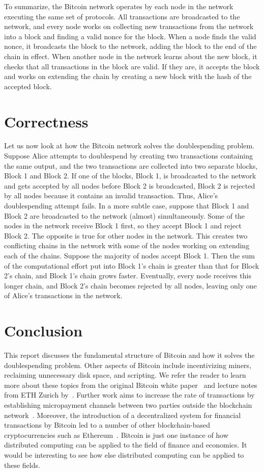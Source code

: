 \documentclass{article}
\begin{document}
To summarize, the Bitcoin network operates by each node in the network executing
the same set of protocols. All transactions are broadcasted to the network, and
every node works on collecting new transactions from the network into a block
and finding a valid nonce for the block. When a node finds the valid nonce, it
broadcasts the block to the network, adding the block to the end of the chain in
effect. When another node in the network learns about the new block, it checks
that all transactions in the block are valid. If they are, it accepts the block
and works on extending the chain by creating a new block with the hash of the
accepted block.

\section{Correctness}

Let us now look at how the Bitcoin network solves the doublespending problem.
Suppose Alice attempts to doublespend by creating two transactions containing
the same output, and the two transactions are collected into two separate
blocks, Block 1 and Block 2. If one of the blocks, Block 1, is broadcasted to
the network and gets accepted by all nodes before Block 2 is broadcasted, Block
2 is rejected by all nodes because it contains an invalid transaction. Thus,
Alice’s doublespending attempt fails. In a more subtle case, suppose that Block
1 and Block 2 are broadcasted to the network (almost) simultaneously. Some of
the nodes in the network receive Block 1 first, so they accept Block 1 and
reject Block 2. The opposite is true for other nodes in the network. This
creates two conflicting chains in the network with some of the nodes working on
extending each of the chains. Suppose the majority of nodes accept Block 1. Then
the sum of the computational effort put into Block 1’s chain is greater than
that for Block 2’s chain, and Block 1’s chain grows faster. Eventually, every
node receives this longer chain, and Block 2’s chain becomes rejected by all
nodes, leaving only one of Alice’s transactions in the network.

\section{Conclusion}

This report discusses the fundamental structure of Bitcoin and how it solves the
doublespending problem. Other aspects of Bitcoin include incentivizing miners,
reclaiming unnecessary disk space, and scripting. We refer the reader to learn
more about these topics from the original Bitcoin white paper~\citep{Nakamoto08}
and lecture notes from ETH Zurich by~\citeauthor{ETH15}. Further work aims to
increase the rate of transactions  by establishing micropayment channels between
two parties outside the blockchain network~\citep{Decker15}. Moreover, the
introduction of a decentralized system for financial transactions by Bitcoin led
to a number of other blockchain-based cryptocurrencies such as
Ethereum~\citep{Buterin14}. Bitcoin is just one instance of how distributed
computing can be applied to the field of finance and economics. It would be
interesting to see how else distributed computing can be applied to these
fields.



\end{document}
